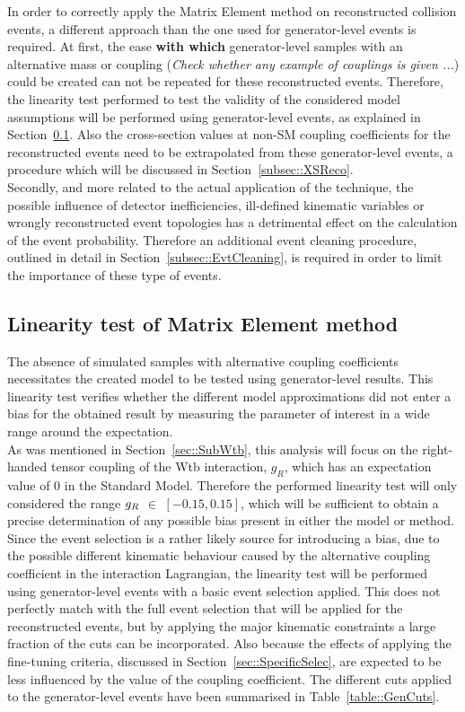 In order to correctly apply the Matrix Element method on reconstructed collision events, a different approach than the one used for generator-level events is required.
At first, the ease \textbf{with which} generator-level samples with an alternative mass or coupling (\textit{Check whether any example of couplings is given ...}) could be created can not be repeated for these reconstructed events. Therefore, the linearity test performed to test the validity of the considered model assumptions will be performed using generator-level events, as explained in Section~\ref{subsec::CalibCurve}. Also the cross-section values at non-SM coupling coefficients for the reconstructed events need to be extrapolated from these generator-level events, a procedure which will be discussed in Section~\ref{subsec::XSReco}.
\\
Secondly, and more related to the actual application of the technique, the possible influence of detector inefficiencies, ill-defined kinematic variables or wrongly reconstructed event topologies has a detrimental effect on the calculation of the event probability. 
Therefore an additional event cleaning procedure, outlined in detail in Section~\ref{subsec::EvtCleaning}, is required in order to limit the importance of these type of events. 


\subsection{Linearity test of Matrix Element method}\label{subsec::CalibCurve}

The absence of simulated samples with alternative coupling coefficients necessitates the created model to be tested using generator-level results. This linearity test verifies whether the different model approximations did not enter a bias for the obtained result by measuring the parameter of interest in a wide range around the expectation.
\\
As was mentioned in Section~\ref{sec::SubWtb}, this analysis will focus on the right-handed tensor coupling of the Wtb interaction, $g_{R}$, which has an expectation value of $0$ in the Standard Model. Therefore the performed linearity test will only considered the range $g_{R}$ $\in$ $\left[-0.15, 0.15\right]$, which will be sufficient to obtain a precise determination of any possible bias present in either the model or method.
\\

Since the event selection is a rather likely source for introducing a bias, due to the possible different kinematic behaviour caused by the alternative coupling coefficient in the interaction Lagrangian, the linearity test will be performed using generator-level events with a basic event selection applied.
This does not perfectly match with the full event selection that will be applied for the reconstructed events, but by applying the major kinematic constraints a large fraction of the cuts can be incorporated. Also because the effects of applying the fine-tuning criteria, discussed in Section~\ref{sec::SpecificSelec}, are expected to be less influenced by the value of the coupling coefficient. The different cuts applied to the generator-level events have been summarised in Table~\ref{table::GenCuts}.

